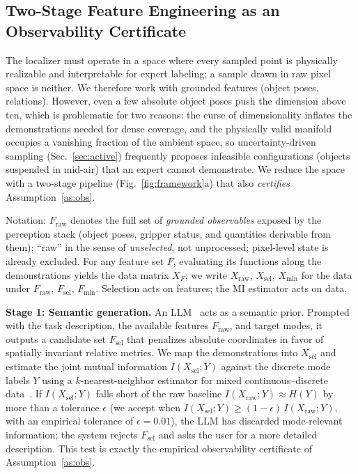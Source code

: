 \subsection{Two-Stage Feature Engineering as an Observability Certificate}
\label{sec:feature_engineering}
The localizer must operate in a space where every sampled point is physically realizable and interpretable for expert labeling; a sample drawn in raw pixel space is neither. We therefore work with grounded features (object poses, relations). However, even a few absolute object poses push the dimension above ten, which is problematic for two reasons: the curse of dimensionality inflates the demonstrations needed for dense coverage, and the physically valid manifold occupies a vanishing fraction of the ambient space, so uncertainty-driven sampling (Sec.~\ref{sec:active}) frequently proposes infeasible configurations (objects suspended in mid-air) that an expert cannot demonstrate. We reduce the space with a two-stage pipeline (Fig.~\ref{fig:framework}a) that also \emph{certifies} Assumption~\ref{as:obs}.

Notation: $F_{\text{raw}}$ denotes the full set of \emph{grounded observables} exposed by the perception stack (object poses, gripper status, and quantities derivable from them); ``raw'' in the sense of \emph{unselected}, not unprocessed; pixel-level state is already excluded. For any feature set $F$, evaluating its functions along the demonstrations yields the data matrix $X_F$; we write $X_{\text{raw}}$, $X_{\text{sel}}$, $X_{\min}$ for the data under $F_{\text{raw}}$, $F_{\text{sel}}$, $F_{\min}$. Selection acts on features; the MI estimator acts on data.

\textbf{Stage 1: Semantic generation.} An LLM~\cite{gemini} acts as a semantic prior. Prompted with the task description, the available features $F_{\text{raw}}$, and target modes, it outputs a candidate set $F_{\text{sel}}$ that penalizes absolute coordinates in favor of spatially invariant relative metrics. We map the demonstrations into $X_{\text{sel}}$ and estimate the joint mutual information $I(X_{\text{sel}};Y)$ against the discrete mode labels $Y$ using a $k$-nearest-neighbor estimator for mixed continuous--discrete data~\cite{10.1371/journal.pone.0087357}. If $I(X_{\text{sel}};Y)$ falls short of the raw baseline $I(X_{\text{raw}};Y)\approx H(Y)$ by more than a tolerance $\epsilon$ (we accept when $I(X_{\text{sel}};Y)\ge(1-\epsilon)\,I(X_{\text{raw}};Y)$, with an empirical tolerance of $\epsilon = 0.01$), the LLM has discarded mode-relevant information; the system rejects $F_{\text{sel}}$ and asks the user for a more detailed description. This test is exactly the empirical observability certificate of Assumption~\ref{as:obs}.

